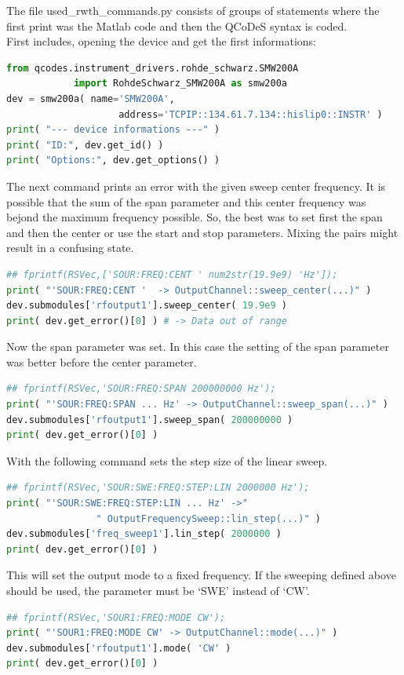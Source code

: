 \documentclass[11pt]{article} %
\begin{document}
The file used\_rwth\_commands.py consists of groups of statements where the first print was the Matlab code and then the QCoDeS syntax is coded.
\\[0.5em]
First includes, opening the device and get the first informations:
\begin{lstlisting}[frame=single, language=Python]
from qcodes.instrument_drivers.rohde_schwarz.SMW200A
			import RohdeSchwarz_SMW200A as smw200a
dev = smw200a( name='SMW200A',
           	        address='TCPIP::134.61.7.134::hislip0::INSTR' )
print( "--- device informations ---" )
print( "ID:", dev.get_id() )
print( "Options:", dev.get_options() )
\end{lstlisting}

The next command prints an error with the given sweep center frequency. It is possible that the sum of the span parameter and this center frequency was bejond the maximum frequency possible. So, the best was to set first the span and then the center or use the start and stop parameters. Mixing the pairs might result in a confusing state.
\begin{lstlisting}[frame=single, language=Python]
## fprintf(RSVec,['SOUR:FREQ:CENT ' num2str(19.9e9) 'Hz']);
print( "'SOUR:FREQ:CENT '  -> OutputChannel::sweep_center(...)" )
dev.submodules['rfoutput1'].sweep_center( 19.9e9 )
print( dev.get_error()[0] ) # -> Data out of range
\end{lstlisting}

Now the span parameter was set. In this case the setting of the span parameter was better before the center parameter.
\begin{lstlisting}[frame=single, language=Python]
## fprintf(RSVec,'SOUR:FREQ:SPAN 200000000 Hz');
print( "'SOUR:FREQ:SPAN ... Hz' -> OutputChannel::sweep_span(...)" )
dev.submodules['rfoutput1'].sweep_span( 200000000 )
print( dev.get_error()[0] )
\end{lstlisting}

With the following command sets the step size of the linear sweep.
\begin{lstlisting}[frame=single, language=Python]
## fprintf(RSVec,'SOUR:SWE:FREQ:STEP:LIN 2000000 Hz');
print( "'SOUR:SWE:FREQ:STEP:LIN ... Hz' ->"
				" OutputFrequencySweep::lin_step(...)" )
dev.submodules['freq_sweep1'].lin_step( 2000000 )
print( dev.get_error()[0] )
\end{lstlisting}

This will set the output mode to a fixed frequency. If the sweeping defined above should be used, the parameter must be `SWE' instead of `CW'.
\begin{lstlisting}[frame=single, language=Python]
## fprintf(RSVec,'SOUR1:FREQ:MODE CW');
print( "'SOUR1:FREQ:MODE CW' -> OutputChannel::mode(...)" )
dev.submodules['rfoutput1'].mode( 'CW' )
print( dev.get_error()[0] )
\end{lstlisting}
\end{document}

